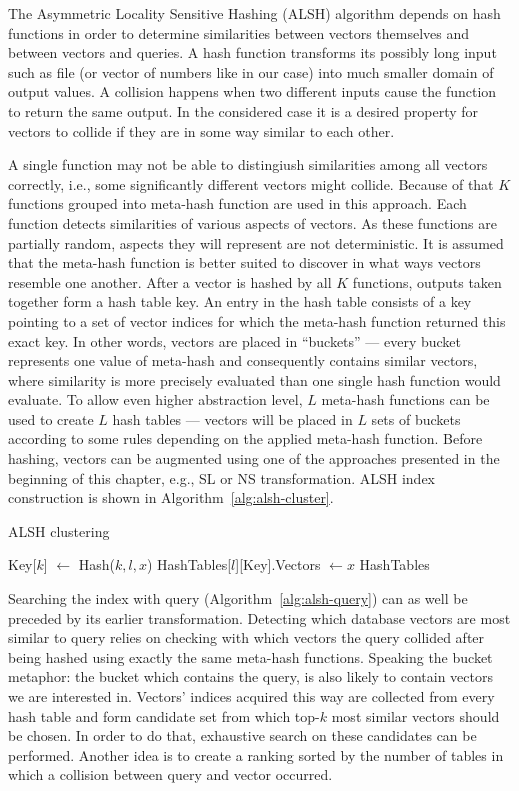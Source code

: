 The Asymmetric Locality Sensitive Hashing (ALSH) \cite{alsh} algorithm depends on hash functions
in order to determine similarities between vectors themselves and between vectors and queries.
A hash function transforms its possibly long input such as file (or vector of numbers like in our case)
into much smaller domain of output values.
A collision happens when two different inputs cause the function to return the same output.
In the considered case it is a desired property for vectors to collide if they are in some way similar to each other.

A single function may not be able to distingiush similarities among all vectors correctly, i.e., some
significantly different vectors might collide. Because of that $K$ functions grouped into
meta-hash function are used in this approach. Each function detects similarities of various aspects of vectors.
As these functions are partially random, aspects they will represent are not deterministic.
It is assumed that the meta-hash function is better suited to discover in what ways vectors
resemble one another.
After a vector is hashed by all $K$ functions, outputs taken together form a hash table key.
An entry in the hash table consists of a key pointing to a set of vector indices for which the meta-hash function
returned this exact key. In other words, vectors are placed in ``buckets'' ---
every bucket represents one value of meta-hash and consequently contains similar vectors, where
similarity is more precisely evaluated than one single hash function would evaluate.
To allow even higher abstraction level, $L$ meta-hash functions can be used to create $L$ hash tables ---
vectors will be placed in $L$ sets of buckets according to some rules depending on the applied meta-hash function.
Before hashing, vectors can be augmented using one of the approaches presented in the beginning
of this chapter, e.g., SL or NS transformation. ALSH index construction is shown in Algorithm~\ref{alg:alsh-cluster}.

\begin{algorithm}
	\caption{ALSH clustering}
	\begin{algorithmic}
				\State Key[$k$] $\gets$ Hash($k, l, x$)
			\EndFor
			\State HashTables[$l$][Key].Vectors $\gets x$
		\EndFor
		\State \Return HashTables
	\end{algorithmic}
\label{alg:alsh-cluster}
\end{algorithm}

Searching the index with query (Algorithm~\ref{alg:alsh-query}) can as well be preceded by its earlier transformation.
Detecting which database vectors are most similar to query relies on checking with which
vectors the query collided after being hashed using exactly the same meta-hash functions.
Speaking the bucket metaphor: the bucket which contains the query, is also likely to contain
vectors we are interested in.
Vectors' indices acquired this way are collected from every hash table and form candidate set from which top-$k$
most similar vectors should be chosen. In order to do that, exhaustive search on these candidates
can be performed.
Another idea is to create a ranking sorted by the number of tables in which a collision
between query and vector occurred.

